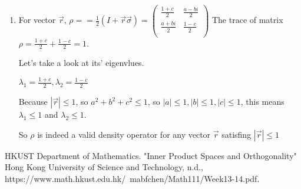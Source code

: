 \documentclass{article}
\begin{document}
\begin{enumerate}
    \item For vector $\vec{r}$, $\rho==\frac{1}{2}(I+\vec{r}\vec{\sigma})=\left(
              \begin{array}{cc}
                      \frac{1+c}{2} & \frac{a-bi}{2} \\\frac{a+bi}{2}&\frac{1-c}{2}\\
                  \end{array}
              \right)$
          The trace of matrix $\rho=\frac{1+c}{2}+\frac{1-c}{2}=1$.

          Let's take a look at its' eigenvlues.

          $\lambda_1=\frac{1+c}{2},\lambda_2=\frac{1-c}{2}$

          Because $|\vec{r}|\leq1$, so $a^2+b^2+c^2\leq1$, so $|a|\leq1,|b|\leq1,|c|\leq1$,
          this means $\lambda_1\leq1$ and $\lambda_2\leq1$.

          So $\rho$ is indeed a valid density operator for any vector $\vec{r}$ satisfing $|\vec{r}|\leq1$
\end{enumerate}
\begin{thebibliography}{1}
    HKUST Department of Mathematics.
    "Inner Product Spaces and Orthogonality"
    Hong Kong University of Science and Technology, n.d.,
    https://www.math.hkust.edu.hk/~mabfchen/Math111/Week13-14.pdf.
\end{thebibliography}
\end{document}
